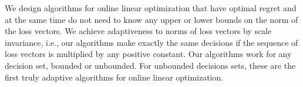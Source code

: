 We design algorithms for online linear optimization that have optimal regret
and at the same time do not need to know any upper or lower bounds on the norm
of the loss vectors.  We achieve adaptiveness to norms of loss vectors by scale
invariance, i.e., our algorithms make exactly the same decisions if the
sequence of loss vectors is multiplied by any positive constant.  Our
algorithms work for any decision set, bounded or unbounded.  For unbounded
decisions sets, these are the first truly adaptive algorithms for online linear
optimization.
